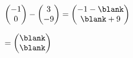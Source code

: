 $\begin{pmatrix} -1 \\ 0 \end{pmatrix}-\begin{pmatrix} 3 \\ -9 \end{pmatrix}=\begin{pmatrix} -1-\blank \\ \blank+9 \end{pmatrix}$\par\noindent\phantom{$\begin{pmatrix} -1 \\ 0 \end{pmatrix}-\begin{pmatrix} 3 \\ -9 \end{pmatrix}$}$=\begin{pmatrix} \blank \\ \blank \end{pmatrix}$
